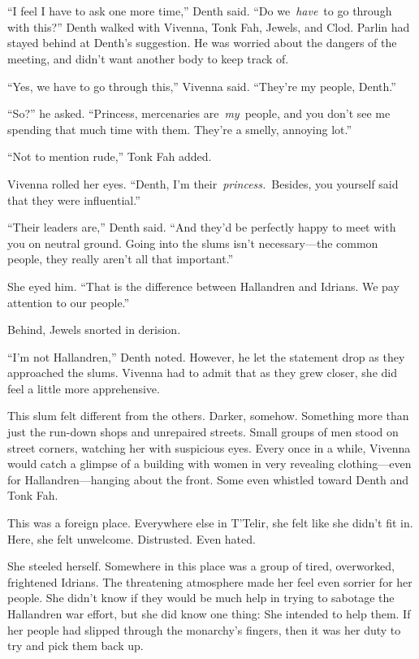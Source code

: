 \chapter{}

“I feel I have to ask one more time,” Denth said. “Do we~\textit{have}~to go through with this?” Denth walked with Vivenna, Tonk Fah, Jewels, and Clod. Parlin had stayed behind at Denth’s suggestion. He was worried about the dangers of the meeting, and didn’t want another body to keep track of.

“Yes, we have to go through this,” Vivenna said. “They’re my people, Denth.”

“So?” he asked. “Princess, mercenaries are~\textit{my}~people, and you don’t see me spending that much time with them. They’re a smelly, annoying lot.”

“Not to mention rude,” Tonk Fah added.

Vivenna rolled her eyes. “Denth, I’m their~\textit{princess.}~Besides, you yourself said that they were influential.”

“Their leaders are,” Denth said. “And they’d be perfectly happy to meet with you on neutral ground. Going into the slums isn’t necessary—the common people, they really aren’t all that important.”

She eyed him. “That is the difference between Hallandren and Idrians. We pay attention to our people.”

Behind, Jewels snorted in derision.

“I’m not Hallandren,” Denth noted. However, he let the statement drop as they approached the slums. Vivenna had to admit that as they grew closer, she did feel a little more apprehensive.

This slum felt different from the others. Darker, somehow. Something more than just the run-down shops and unrepaired streets. Small groups of men stood on street corners, watching her with suspicious eyes. Every once in a while, Vivenna would catch a glimpse of a building with women in very revealing clothing—even for Hallandren—hanging about the front. Some even whistled toward Denth and Tonk Fah.

This was a foreign place. Everywhere else in T’Telir, she felt like she didn’t fit in. Here, she felt unwelcome. Distrusted. Even hated.

She steeled herself. Somewhere in this place was a group of tired, overworked, frightened Idrians. The threatening atmosphere made her feel even sorrier for her people. She didn’t know if they would be much help in trying to sabotage the Hallandren war effort, but she did know one thing: She intended to help them. If her people had slipped through the monarchy’s fingers, then it was her duty to try and pick them back up.

